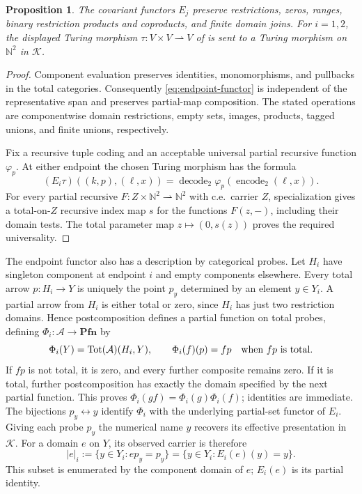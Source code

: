\documentclass[11pt]{article}
\newtheorem{proposition}[theorem]{Proposition}
\newcommand{\N}{\mathbb N}
\newcommand{\Pfn}{\mathbf{Pfn}}
\begin{document}
\begin{proposition}\label{prop:endpoint}
The covariant functors $E_j$ preserve restrictions, zeros, ranges,
binary restriction products and coproducts, and finite domain joins.
For $i=1,2$, the displayed Turing morphism
$\tau:V\times V\rightharpoonup V$ of \cite{ThreePoint} is sent
to a Turing morphism on $\N^2$ in $\mathcal K$.
\end{proposition}
\begin{proof}
Component evaluation preserves identities, monomorphisms, and
pullbacks in the total categories. Consequently \eqref{eq:endpoint-functor}
is independent of the representative span and preserves partial-map
composition. The stated operations are componentwise domain
restrictions, empty sets, images, products, tagged unions, and finite
unions, respectively.

Fix a recursive tuple coding and an acceptable universal partial
recursive function $\varphi_p$. At either endpoint the chosen
Turing morphism has the formula
\[
 (E_i\tau)((k,p),(\ell,x))
 =\operatorname{decode}_2\varphi_p(\operatorname{encode}_2(\ell,x)).
\]
For every partial recursive
$F:Z\times\N^2\rightharpoonup\N^2$ with c.e.\ carrier $Z$,
specialization gives a total-on-$Z$ recursive index map $s$ for
the functions $F(z,-)$, including their domain tests.
The total parameter map $z\mapsto(0,s(z))$ proves the required
universality.
\end{proof}

The endpoint functor also has a description by categorical probes.
Let $H_i$ have singleton component at endpoint $i$ and empty
components elsewhere. Every total arrow $p:H_i\to Y$ is uniquely
the point $p_y$ determined by an element $y\in Y_i$. A partial
arrow from $H_i$ is either total or zero, since $H_i$ has just
two restriction domains. Hence postcomposition defines a partial
function on total probes, defining $\Phi_i:\mathcal A\to\Pfn$ by
\[
 \Phi_i(Y)=\operatorname{Tot}(\mathcal A)(H_i,Y),\qquad
 \Phi_i(f)(p)=fp\quad\hbox{when }fp\hbox{ is total}.
\]
If $fp$ is not total, it is zero, and every further composite
remains zero. If it is total, further postcomposition has exactly
the domain specified by the next partial function. This proves
$\Phi_i(gf)=\Phi_i(g)\Phi_i(f)$; identities are immediate.
The bijections $p_y\leftrightarrow y$ identify $\Phi_i$ with the
underlying partial-set functor of $E_i$. Giving each probe $p_y$
the numerical name $y$ recovers its effective presentation in
$\mathcal K$.
For a domain $e$ on $Y$, its observed carrier is therefore
\begin{equation}\label{eq:probe-domain}
 |e|_i:=\{y\in Y_i:ep_y=p_y\}
       =\{y\in Y_i:E_i(e)(y)=y\}.
\end{equation}
This subset is enumerated by the component domain of $e$;
$E_i(e)$ is its partial identity.
\end{document}
